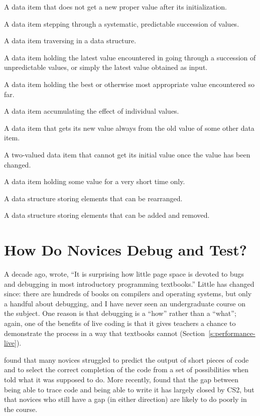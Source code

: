 \begin{description}
\tightlist
\item[Fixed value:]
A data item that does not get a new proper value after its
initialization.
\item[Stepper:]
A data item stepping through a systematic, predictable succession of
values.
\item[Walker:]
A data item traversing in a data structure.
\item[Most-recent holder:]
A data item holding the latest value encountered in going through a
succession of unpredictable values, or simply the latest value
obtained as input.
\item[Most-wanted holder:]
A data item holding the best or otherwise most appropriate value
encountered so far.
\item[Gatherer:]
A data item accumulating the effect of individual values.
\item[Follower:]
A data item that gets its new value always from the old value of
some other data item.
\item[One-way flag:]
A two-valued data item that cannot get its initial value once the
value has been changed.
\item[Temporary:]
A data item holding some value for a very short time only.
\item[Organizer:]
A data structure storing elements that can be rearranged.
\item[Container:]
A data structure storing elements that can be added and removed.
\end{description}

\section{How Do Novices Debug and Test?}\label{s:pck-debug}

A decade ago, \cite{McCa2008} wrote, ``It is surprising how little
page space is devoted to bugs and debugging in most introductory
programming textbooks.'' Little has changed since: there are hundreds of
books on compilers and operating systems, but only a handful about
debugging, and I have never seen an undergraduate course on the subject.
One reason is that debugging is a ``how'' rather than a ``what''; again, one
of the benefits of live coding is that it gives teachers a chance to
demonstrate the process in a way that textbooks cannot
(Section~\ref{s:performance-live}).

\cite{List2004,List2009} found that many novices struggled to predict
the output of short pieces of code and to select the correct completion
of the code from a set of possibilities when told what it was supposed
to do. More recently, \cite{Harr2018} found that the gap between
being able to trace code and being able to write it has largely closed
by CS2, but that novices who still have a gap (in either direction) are
likely to do poorly in the course.

